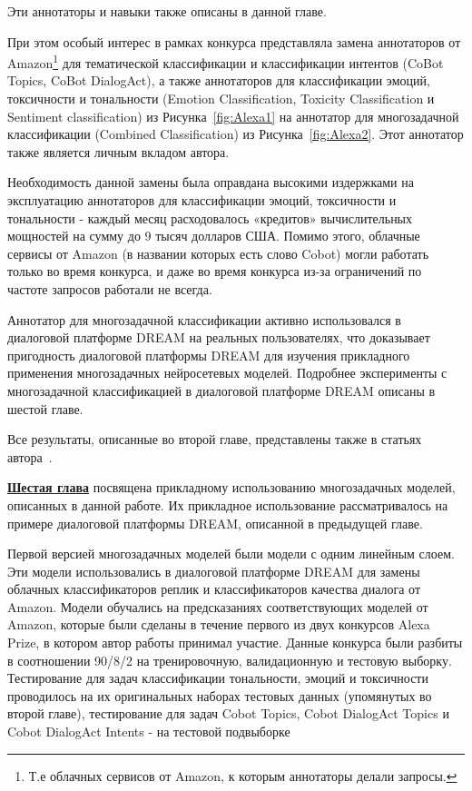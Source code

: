 Эти аннотаторы и навыки также описаны в данной главе. 

При этом особый интерес в рамках конкурса представляла замена аннотаторов от Amazon\footnote{Т.е облачных сервисов от Amazon, к которым аннотаторы делали запросы.} для тематической классификации и классификации интентов (CoBot Topics, CoBot DialogAct), а также аннотаторов для классификации эмоций, токсичности и тональности (Emotion Classification, Toxicity Classification и Sentiment classification) из Рисунка~\ref{fig:Alexa1} на аннотатор для многозадачной классификации (Combined Classification) из Рисунка~\ref{fig:Alexa2}. Этот аннотатор также является личным вкладом автора.

Необходимость данной замены была оправдана высокими издержками на эксплуатацию аннотаторов для классификации эмоций, токсичности и тональности - каждый месяц расходовалось «кредитов» вычислительных мощностей на сумму до 9 тысяч долларов США. Помимо этого, облачные сервисы от Amazon (в названии которых есть слово Cobot) могли работать только во время конкурса, и даже во время конкурса из-за ограничений по частоте запросов работали не всегда.

Аннотатор для многозадачной классификации активно использовался в диалоговой платформе DREAM на реальных пользователях, что доказывает пригодность диалоговой платформы DREAM для изучения прикладного применения многозадачных нейросетевых моделей. Подробнее эксперименты с многозадачной классификацией в диалоговой платформе DREAM описаны в шестой главе.

Все результаты, описанные во второй главе, представлены также в статьях автора~\cite{dream1,dream1_trudy,dream2}.

\underline{\textbf{Шестая глава}} посвящена прикладному использованию многозадачных моделей, описанных в данной работе. Их прикладное использование рассматривалось на примере диалоговой платформы DREAM, описанной в предыдущей главе.

Первой версией многозадачных моделей были модели с одним линейным слоем. Эти модели использовались в диалоговой платформе DREAM для замены облачных классификаторов реплик и классификаторов качества диалога от Amazon. Модели обучались на предсказаниях соответствующих моделей от Amazon, которые были сделаны в течение первого из двух конкурсов Alexa Prize, в котором автор работы принимал участие. Данные конкурса были разбиты в соотношении 90/8/2 на тренировочную, валидационную и тестовую выборку. Тестирование для задач классификации тональности, эмоций и токсичности проводилось на их оригинальных наборах тестовых данных (упомянутых во второй главе), тестирование для задач Cobot Topics, Cobot DialogAct Topics и Cobot DialogAct Intents - на тестовой подвыборке

